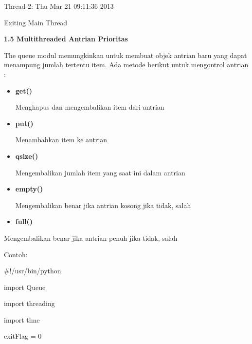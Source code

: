\documentclass [12pt,a4paper,notitlepage,oneside,bahasa]{article}
\begin{document}
\noindent 
{\fontsize{10pt}{10pt}\selectfont Thread-2: Thu Mar 21 09:11:36 2013} \par
\noindent 
{\fontsize{10pt}{10pt}\selectfont Exiting Main Thread} \par
\vspace{12pt}
\textbf{1.5 Multithreaded Antrian Prioritas} \par
The queue modul memungkinkan untuk membuat objek antrian baru yang dapat menampung jumlah tertentu item. Ada metode berikut untuk mengontrol antrian : \par
\begin{itemize}
	\item \textbf{get()} \par
		Menghapus dan mengembalikan item dari antrian
	\par
	\item \textbf{put()} \par
		Menambahkan item ke antrian
	\par
	\item \textbf{qsize()} \par
		Mengembalikan jumlah item yang saat ini dalam antrian
	\par
	\item \textbf{empty()} \par
		Mengembalikan benar jika antrian kosong jika tidak, salah
	\par
	\item \textbf{full()}\end{itemize}
\par
	Mengembalikan benar jika antrian penuh jika tidak, salah
\par
\vspace{12pt}
\vspace{12pt}
\vspace{12pt}
\noindent 
Contoh: \par
\noindent 
{\fontsize{10pt}{10pt}\selectfont  $  \#  $!/usr/bin/python} \par
\vspace{10pt}
\noindent 
{\fontsize{10pt}{10pt}\selectfont import Queue} \par
\noindent 
{\fontsize{10pt}{10pt}\selectfont import threading} \par
\noindent 
{\fontsize{10pt}{10pt}\selectfont import time} \par
\vspace{10pt}
\noindent 
{\fontsize{10pt}{10pt}\selectfont exitFlag = 0} \par
\vspace{10pt}
\end{document}
